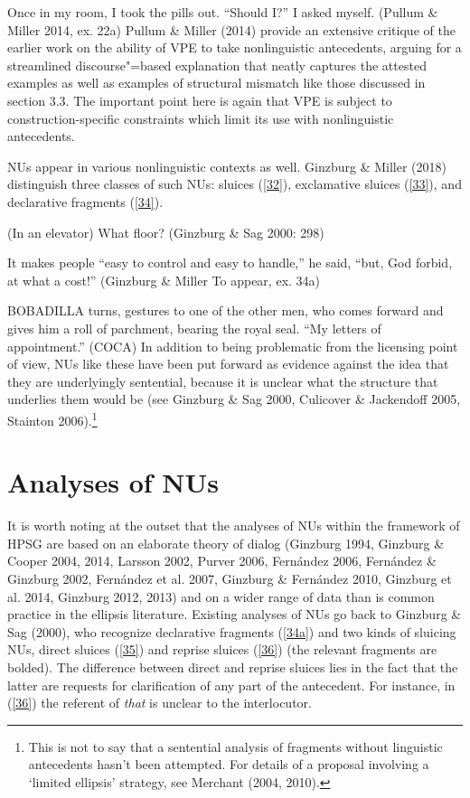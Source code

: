 \documentclass[output=paper]{langsci/langscibook}
\begin{document}
{\ea Once in my room, I took the pills out. ``Should I?'' I asked myself. (Pullum \& Miller 2014, ex. 22a)\label{31}\z
Pullum \& Miller (2014) provide an extensive critique of the earlier work on the ability of VPE to take nonlinguistic antecedents, arguing for a streamlined discourse"=based explanation that neatly captures the attested examples as well as examples of structural mismatch like those discussed in section 3.3. The important point here is again that VPE is subject to construction-specific constraints which limit its use with nonlinguistic antecedents.

NUs appear in various nonlinguistic contexts as well. Ginzburg \& Miller (2018) distinguish three classes of such NUs: sluices (\ref{32}), exclamative sluices (\ref{33}), and declarative fragments (\ref{34}).

\ea (In an elevator) What floor? (Ginzburg \& Sag 2000: 298)\label{32}\z

\ea It makes people ``easy to control and easy to handle,'' he said, ``but, God forbid, at what a cost!'' (Ginzburg \& Miller To appear, ex. 34a)\label{33}\z

\ea BOBADILLA turns, gestures to one of the other men, who comes forward and gives him a roll of parchment, bearing the royal seal. ``My letters of appointment.'' (COCA)\label{34}\z
In addition to being problematic from the licensing point of view, NUs like these have been put forward as evidence against the idea that they are underlyingly sentential, because it is unclear what the structure that underlies them would be (see Ginzburg \& Sag 2000, Culicover \& Jackendoff 2005, Stainton 2006).\footnote{This is not to say that a sentential analysis of fragments without linguistic antecedents hasn't been attempted. For details of a proposal involving a `limited ellipsis' strategy, see Merchant (2004, 2010).}


\section{Analyses of NUs}
It is worth noting at the outset that the analyses of NUs within the framework of HPSG are based on an elaborate theory of dialog (Ginzburg 1994, Ginzburg \& Cooper 2004, 2014, Larsson 2002, Purver 2006, Fern\'{a}ndez 2006, Fern\'{a}ndez \& Ginzburg 2002, Fern\'{a}ndez et al. 2007, Ginzburg \& Fern\'{a}ndez 2010, Ginzburg et al. 2014, Ginzburg 2012, 2013) and on a wider range of data than is common practice in the ellipsis literature. Existing analyses of NUs go back to Ginzburg \& Sag (2000), who recognize declarative fragments (\ref{34a}) and two kinds of sluicing NUs, direct sluices (\ref{35}) and reprise sluices (\ref{36}) (the relevant fragments are bolded). The difference between direct and reprise sluices lies in the fact that the latter are requests for clarification of any part of the antecedent. For instance, in (\ref{36}) the referent of {\it that} is unclear to the interlocutor.

}
\end{document}
